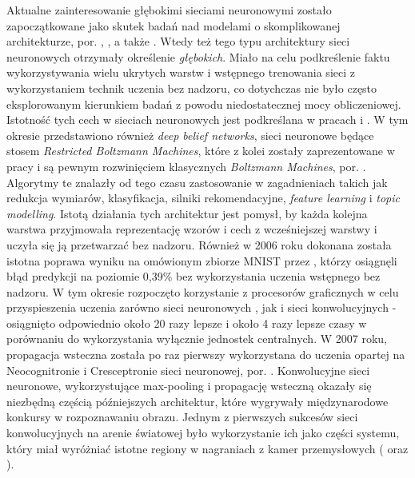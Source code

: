 \documentclass[12pt,a4paper,twoside]{article}
\begin{document}
Aktualne zainteresowanie głębokimi sieciami neuronowymi zostało zapoczątkowane jako skutek badań nad modelami o skomplikowanej architekturze, por. \citet{hinton2006a}, \citet{hinton2006b}, a także \citet{bengio2007a}. Wtedy też tego typu architektury sieci neuronowych otrzymały określenie \textit{głębokich}. Miało na celu podkreślenie faktu wykorzystywania wielu ukrytych warstw i wstępnego trenowania sieci z wykorzystaniem technik uczenia bez nadzoru, co dotychczas nie było często eksplorowanym kierunkiem badań z powodu niedostatecznej mocy obliczeniowej. Istotność tych cech w sieciach neuronowych jest podkreślana w pracach \citet{bengio2007b} i \citet{bengio2011}.
W tym okresie przedstawiono również \textit{deep belief networks}, sieci neuronowe będące stosem \textit{Restricted Boltzmann Machines}, które z kolei zostały zaprezentowane w pracy \citet{smolensky1986} i są pewnym rozwinięciem klasycznych \textit{Boltzmann Machines}, por. \citet{hinton1986}. Algorytmy te znalazły od tego czasu zastosowanie w zagadnieniach takich jak redukcja wymiarów, klasyfikacja, silniki rekomendacyjne, \textit{feature learning} i \textit{topic modelling}. Istotą działania tych architektur jest pomysł, by każda kolejna warstwa przyjmowała reprezentację wzorów i cech z wcześniejszej warstwy i uczyła się ją przetwarzać bez nadzoru. Również w 2006 roku dokonana została istotna poprawa wyniku na omówionym zbiorze MNIST przez \citet{ranzato2006}, którzy osiągnęli błąd predykcji na poziomie 0,39\% bez wykorzystania uczenia wstępnego bez nadzoru. W tym okresie rozpoczęto korzystanie z procesorów graficznych w celu przyspieszenia uczenia zarówno sieci neuronowych \citep{oh2004}, jak i sieci konwolucyjnych \citep{chellapilla2006} - osiągnięto odpowiednio około 20 razy lepsze i około 4 razy lepsze czasy w porównaniu do wykorzystania wyłącznie jednostek centralnych.
W 2007 roku, propagacja wsteczna została po raz pierwszy wykorzystana do uczenia opartej na Neocognitronie i Cresceptronie sieci neuronowej, por. \citet{ranzato2007}. Konwolucyjne sieci neuronowe, wykorzystujące max-pooling i propagację wsteczną okazały się niezbędną częścią późniejszych architektur, które wygrywały międzynarodowe konkursy w rozpoznawaniu obrazu. Jednym z pierwszych sukcesów sieci konwolucyjnych na arenie światowej było wykorzystanie ich jako części systemu, który miał wyróżniać istotne regiony w nagraniach z kamer przemysłowych (\citet{jain2009} oraz \citet{yang2009}).
\end{document}
